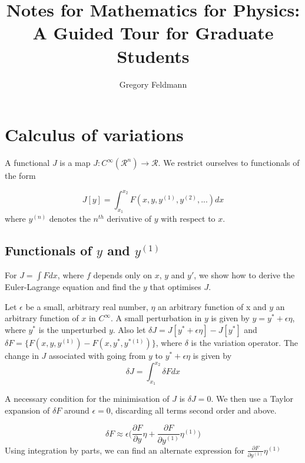 \documentclass[]{article}
\title{Notes for Mathematics for Physics: A Guided Tour for Graduate Students}
\author{Gregory Feldmann}
\begin{document}
\maketitle

\tableofcontents
\newpage

\section{Calculus of variations}

A functional $J$ is a map $J:C^{\infty}(\mathcal{R}^{n}) \rightarrow \mathcal{R}$. We restrict ourselves to functionals of the form

\begin{equation} J[y] = \int_{x_{1}}^{x_{2}} F(x,y,y^{(1)},y^{(2)},...)dx \label{functional_def} \end{equation}
where $y^{(n)}$ denotes the $n^{th}$ derivative of $y$ with respect to $x$.

\subsection{Functionals of $y$ and $y^{(1)}$}

For $J=\int Fdx$, where $f$ depends only on $x$, $y$ and $y'$, we show how to derive the Euler-Lagrange equation and find the $y$ that optimises $J$. 

Let $\epsilon$ be a small, arbitrary real number, $\eta$ an arbitrary function of x and $y$ an arbitrary function of $x$ in $C^{\infty}$. A small perturbation in $y$ is given by $y = y^{*} + \epsilon \eta$, where $y^{*}$ is the unperturbed $y$. Also let $\delta J = J[y^{*} + \epsilon \eta] - J[y^{*}] $ and $\delta  F = \{ F(x, y, y^{(1)})-F(x,y^{*},y^{*(1)}) \}$, where $\delta$ is the variation operator. The change in $J$ associated with going from $y$ to $y^{*} + \epsilon \eta$ is given by
\begin{equation} \delta J = \int_{x_{1}}^{x_{2}} \delta  F dx \label{variational_functional_example}\end{equation}

A necessary condition for the minimisation of $J$ is $\delta J= 0$. We then use a Taylor expansion of $\delta F$ around $\epsilon = 0$, discarding all terms second order and above.

\begin{equation} \delta F \approx \epsilon \bigg(\frac{\partial F}{\partial y} \eta+ \frac{\partial F}{\partial y^{(1)}}\eta^{(1)}\bigg) \label{taylor_expansion_example} \end{equation}
Using integration by parts, we can find an alternate expression for $\frac{\partial F}{\partial y^{(1)}}\eta^{(1)}$
\end{document}
